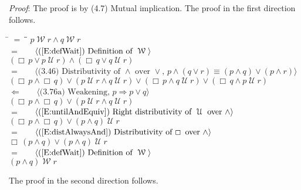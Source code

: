 \documentclass[12pt, fleqn, leqno]{article}
\newcommand{\lgap}{2pt}                             %
\newcommand{\mymathindent}{24pt}                    %
\newcommand{\impl}{\ensuremath{\Rightarrow}}        %
\newcommand{\foll}{\ensuremath{\Leftarrow}}         %
\newcommand{\Until}{\;\mathcal{U}\;}
\newcommand{\Wait}{\;\mathcal{W}\;}
\newcommand{\Always}{\Box\,}
\newcommand{\myqedtab}{\hspace{384pt}}              %
\newcommand{\Gll} {\langle}                         %
\newcommand{\Ggg} {\rangle}                         %
\newcommand{\Hint}[1]     {\ \ \ $\Gll              \mbox{#1} \Ggg$ }   %
\begin{document}
\emph{Proof}: The proof is by (4.7) Mutual implication.
The proof in the first direction follows.
\begin{tabbing}
\hspace{\mymathindent} \= $= \;$ \= \myqedtab \= \kill
  \> \>   $p \Wait r \land q \Wait r$\\[\lgap]
  \> $=$ \> \Hint{(\ref{E:defWait}) Definition of $\Wait$} \\[\lgap]
  \> \>   $(\Always p\lor p \Until r) \land (\Always q\lor q \Until r)$\\[\lgap]
  \> $=$ \> \Hint{(3.46) Distributivity of $\land$ over $\lor$, $p\land (q\lor r)\equiv (p\land q)\lor (p\land r)$} \\[\lgap]
  \> \>   $(\Always p\land \Always q) \lor (p \Until r\land q\Until r) \lor (\Always p \land q\Until r) \lor (\Always q\land p \Until r)$\\[\lgap]
  \> $\foll$ \> \Hint{(3.76a) Weakening, $p\impl p\lor q$} \\[\lgap]
  \> \>   $(\Always p\land \Always q) \lor (p \Until r\land q\Until r)$\\[\lgap]
  \> $=$ \> \Hint{(\ref{E:untilAndEquiv}) Right distributivity of $\Until$ over $\land$} \\[\lgap]
  \> \>   $(\Always p\land \Always q) \lor (p\land q) \Until r$\\[\lgap]
  \> $=$  \>  \Hint{(\ref{E:distAlwaysAnd}) Distributivity of $\Always$ over $\land$}\\[\lgap]
  \> \>   $\Always (p\land q) \lor (p\land q) \Until r$\\[\lgap]
  \> $=$ \> \Hint{(\ref{E:defWait}) Definition of $\Wait$} \\[\lgap]
  \> \>   $(p\land q) \Wait r$
\end{tabbing}
The proof in the second direction follows.
\end{document}
